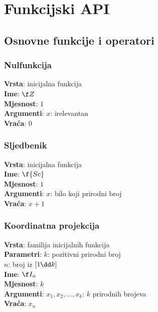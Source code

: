 \setlength{\parindent}{0pt}

\chapter{Funkcijski API}

\section{Osnovne funkcije i operatori}

\subsection{Nulfunkcija}
\textbf{Vrsta}: inicijalna funkcija\\
\textbf{Ime}: $\f Z$\\
\textbf{Mjesnost}: $1$\\
\textbf{Argumenti}: $x$: irelevantan\\
\textbf{Vraća}: $0$

\subsection{Sljedbenik}
\textbf{Vrsta}: inicijalna funkcija\\
\textbf{Ime}: $\f{Sc}$\\
\textbf{Mjesnost}: $1$\\
\textbf{Argumenti}: $x$: bilo koji prirodni broj\\
\textbf{Vraća}: $x+1$

\subsection{Koordinatna projekcija}
\textbf{Vrsta}: familija inicijalnih funkcija\\
\textbf{Parametri}: $k$: pozitivni prirodni broj\\
$n$: broj iz $[1\mspace{-1mu}\dd k]$\\
\textbf{Ime}: $\f I_n$\\
\textbf{Mjesnost}: $k$\\
\textbf{Argumenti}: $x_1,x_2,\dots,x_k$: $k$ prirodnih brojeva\\
\textbf{Vraća}: $x_n$

